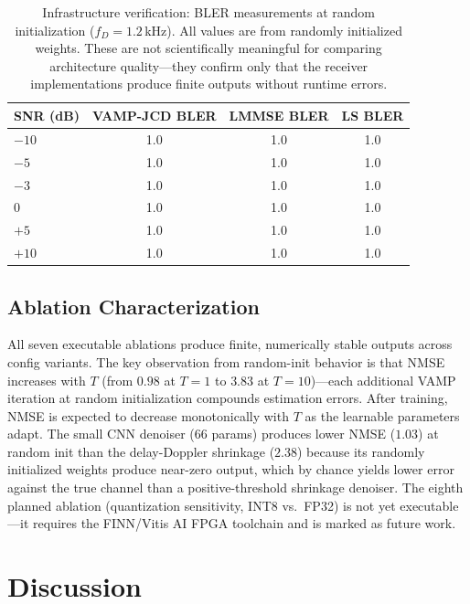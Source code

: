 \documentclass{article}
\begin{document}
\begin{table}[h]
  \centering
  \caption{Infrastructure verification: BLER measurements at random initialization ($f_D = 1.2$\,kHz). All values are from randomly initialized weights. These are not scientifically meaningful for comparing architecture quality---they confirm only that the receiver implementations produce finite outputs without runtime errors.}
  \label{tab:baseline}
  \begin{tabular}{@{}lccc@{}}
    \toprule
    SNR (dB) & VAMP-JCD BLER & LMMSE BLER & LS BLER \\
    \midrule
    $-10$ & 1.0 & 1.0 & 1.0 \\
    $-5$  & 1.0 & 1.0 & 1.0 \\
    $-3$  & 1.0 & 1.0 & 1.0 \\
    $0$   & 1.0 & 1.0 & 1.0 \\
    $+5$  & 1.0 & 1.0 & 1.0 \\
    $+10$ & 1.0 & 1.0 & 1.0 \\
    \bottomrule
  \end{tabular}
\end{table}

\subsection{Ablation Characterization}

All seven executable ablations produce finite, numerically stable outputs across config variants. The key observation from random-init behavior is that NMSE increases with $T$ (from $0.98$ at $T=1$ to $3.83$ at $T=10$)---each additional VAMP iteration at random initialization compounds estimation errors. After training, NMSE is expected to decrease monotonically with $T$ as the learnable parameters adapt. The small CNN denoiser ($66$ params) produces lower NMSE ($1.03$) at random init than the delay-Doppler shrinkage ($2.38$) because its randomly initialized weights produce near-zero output, which by chance yields lower error against the true channel than a positive-threshold shrinkage denoiser. The eighth planned ablation (quantization sensitivity, INT8 vs.\ FP32) is not yet executable---it requires the FINN/Vitis AI FPGA toolchain and is marked as future work.

\section{Discussion}
\label{sec:discussion}
\end{document}
